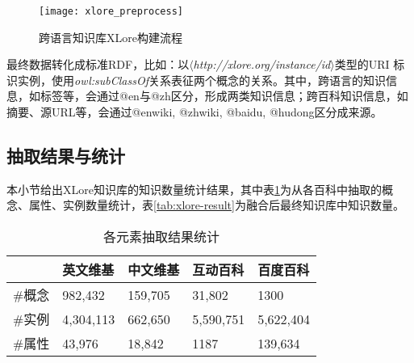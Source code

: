 \begin{figure}[ht]
  \centering
  \texttt{[image: xlore\_preprocess]}
  \caption{跨语言知识库XLore构建流程}
  \label{fig:xlore-preprocess}
\end{figure}

最终数据转化成标准RDF，比如：以$\langle$\emph{http://xlore.org/instance/id}$\rangle$类型的URI 标识实例，使用\textit{owl:subClassOf}关系表征两个概念的关系。其中，跨语言的知识信息，如标签等，会通过@en与@zh区分，形成两类知识信息；跨百科知识信息，如摘要、源URL等，会通过@enwiki, @zhwiki, @baidu, @hudong区分成来源。

\subsection{抽取结果与统计}
本小节给出XLore知识库的知识数量统计结果，其中表\ref{tab:extract-result}为从各百科中抽取的概念、属性、实例数量统计，表\ref{tab:xlore-result}为融合后最终知识库中知识数量。

\begin{table}[htb]
    \centering
  \begin{minipage}[t]{0.8\linewidth}
    \caption{各元素抽取结果统计}
    \label{tab:extract-result}
    \begin{tabularx}{\linewidth}{lXXXX}
        \toprule[1.5pt]
               & 英文维基    & 中文维基   & 互动百科    & 百度百科     \\ \midrule[1pt]
        \#概念 & 982,432   & 159,705  & 31,802    & 1300      \\
        \#实例 & 4,304,113 & 662,650  & 5,590,751 & 5,622,404 \\
        \#属性 & 43,976    & 18,842   & 1187      & 139,634   \\
        \bottomrule[1.5pt]
    \end{tabularx}
  \end{minipage}
\end{table}

